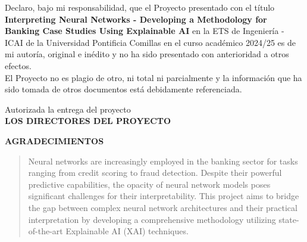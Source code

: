 \documentclass[12pt]{extarticle}
\numberwithin{equation}{section}
\begin{document}
\newpage

{\fontsize{14}{18}\selectfont
    Declaro, bajo mi responsabilidad, que el Proyecto presentado con el título \textbf{Interpreting Neural Networks - Developing a Methodology for Banking Case Studies Using Explainable AI} en la ETS de Ingeniería - ICAI de la Universidad Pontificia Comillas en el curso académico 2024/25 es de mi autoría, original e inédito y no ha sido presentado con anterioridad a otros efectos. \\
    
    El Proyecto no es plagio de otro, ni total ni parcialmente y la información que ha sido tomada de otros documentos está debidamente referenciada.
    
    \vspace{2cm}  %
    
    \noindent

    
    \vspace{2cm}  %
    
    \begin{center}
        Autorizada la entrega del proyecto \\
        \vspace{1cm}
        \textbf{LOS DIRECTORES DEL PROYECTO}
    \end{center}
    
    \vspace{1cm}  %
    
    \noindent
    \noindent
}

\newpage

{\fontsize{17}{20}\selectfont
    \begin{center}
        \textbf{AGRADECIMIENTOS}
    \end{center}
}

\newpage
\begin{abstract}
    Neural networks are increasingly employed in the banking sector for tasks ranging from credit scoring to fraud detection. Despite their powerful predictive capabilities, the opacity of neural network models poses significant challenges for their interpretability. This project aims to bridge the gap between complex neural network architectures and their practical interpretation by developing a comprehensive methodology utilizing state-of-the-art Explainable AI (XAI) techniques.
\end{abstract}
\end{document}
